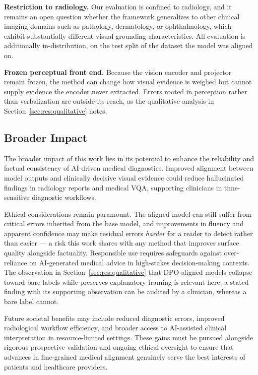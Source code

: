\textbf{Restriction to radiology.} Our evaluation is confined to radiology, and it remains an open question whether the framework generalizes to other clinical imaging domains such as pathology, dermatology, or ophthalmology, which exhibit substantially different visual grounding characteristics. All evaluation is additionally in-distribution, on the test split of the dataset the model was aligned on.

\textbf{Frozen perceptual front end.} Because the vision encoder and projector remain frozen, the method can change how visual evidence is weighed but cannot supply evidence the encoder never extracted. Errors rooted in perception rather than verbalization are outside its reach, as the qualitative analysis in Section~\ref{sec:res:qualitative} notes.

\subsection{Broader Impact}
\label{sec:con:impact}

The broader impact of this work lies in its potential to enhance the reliability and factual consistency of AI-driven medical diagnostics. Improved alignment between model outputs and clinically decisive visual evidence could reduce hallucinated findings in radiology reports and medical VQA, supporting clinicians in time-sensitive diagnostic workflows.

Ethical considerations remain paramount. The aligned model can still suffer from critical errors inherited from the base model, and improvements in fluency and apparent confidence may make residual errors \emph{harder} for a reader to detect rather than easier --- a risk this work shares with any method that improves surface quality alongside factuality. Responsible use requires safeguards against over-reliance on AI-generated medical advice in high-stakes decision-making contexts. The observation in Section~\ref{sec:res:qualitative} that DPO-aligned models collapse toward bare labels while \ourloss{} preserves explanatory framing is relevant here: a stated finding with its supporting observation can be audited by a clinician, whereas a bare label cannot.

Future societal benefits may include reduced diagnostic errors, improved radiological workflow efficiency, and broader access to AI-assisted clinical interpretation in resource-limited settings. These gains must be pursued alongside rigorous prospective validation and ongoing ethical oversight to ensure that advances in fine-grained medical alignment genuinely serve the best interests of patients and healthcare providers.

